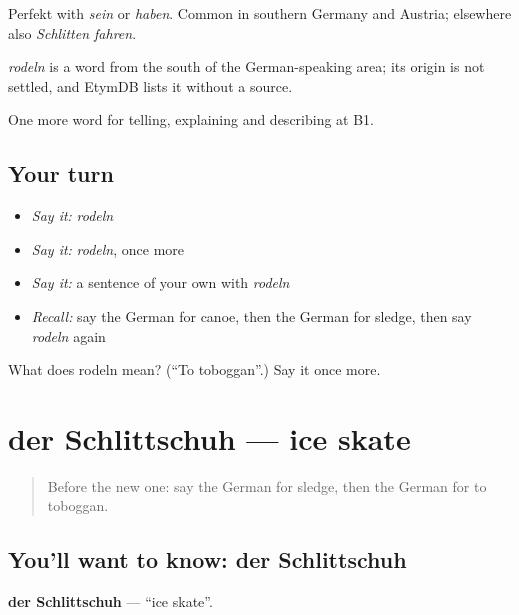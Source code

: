 Perfekt with \emph{sein} or \emph{haben}. Common in southern Germany and Austria; elsewhere also \emph{Schlitten fahren}.

\begin{cousinweb}
\emph{rodeln} is a word from the south of the German-speaking area; its origin is not settled, and EtymDB lists it without a source.
\end{cousinweb}

\begin{grammarlens}[title={What you've built}]
One more word for telling, explaining and describing at B1.
\end{grammarlens}

\subsection*{Your turn}
\begin{itemize}
\raggedright
  \item \emph{Say it:} \emph{rodeln}
  \item \emph{Say it:} \emph{rodeln}, once more
  \item \emph{Say it:} a sentence of your own with \emph{rodeln}
  \item \emph{Recall:} say the German for canoe, then the German for sledge, then say \emph{rodeln} again
\end{itemize}

\begin{tcolorbox}[breakable,colback=teal!4,colframe=teal!35!black,title={Before you move on}]
What does rodeln mean? (\textquotedblleft{}To toboggan\textquotedblright{}.) Say it once more.
\end{tcolorbox}
\section[der Schlittschuh]{der Schlittschuh — ice skate}

\label{lesson:GE-C512-schlittschuh}



\begin{quote}
Before the new one: say the German for sledge, then the German for to toboggan.
\end{quote}

\subsection*{You'll want to know: der Schlittschuh}
\textbf{der Schlittschuh} — \textquotedblleft{}ice skate\textquotedblright{}.

